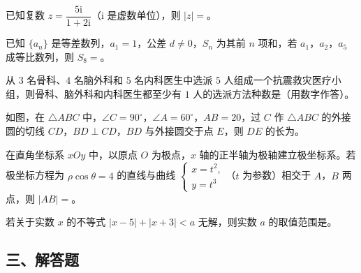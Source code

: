 \begin{question}
已知复数 $z=\dfrac{5\mathrm i}{1+2\mathrm i}$（$\mathrm i$ 是虚数单位），则 $|z|=$\gkblank{}。

\end{question}
\begin{question}
已知 $\{a_n\}$ 是等差数列，$a_1=1$，公差 $d\neq0$，$S_n$ 为其前 $n$ 项和，若 $a_1$，$a_2$，$a_5$ 成等比数列，则 $S_8=$\gkblank{}。

\end{question}
\begin{question}
从 $3$ 名骨科、$4$ 名脑外科和 $5$ 名内科医生中选派 $5$ 人组成一个抗震救灾医疗小组，则骨科、脑外科和内科医生都至少有 $1$ 人的选派方法种数是\gkblank{}（用数字作答）。

\Needspace{0.4\textheight}
\end{question}
\begin{question}
如图，在 $\triangle ABC$ 中，$\angle C=90^\circ$，$\angle A=60^\circ$，$AB=20$，过 $C$ 作 $\triangle ABC$ 的外接圆的切线 $CD$，$BD\perp CD$，$BD$ 与外接圆交于点 $E$，则 $DE$ 的长为\gkblank{}。
\nopagebreak[4]
\begin{center}\end{center}
\nopagebreak[4]
\end{question}
\begin{question}
在直角坐标系 $xOy$ 中，以原点 $O$ 为极点，$x$ 轴的正半轴为极轴建立极坐标系。若极坐标方程为 $\rho\cos\theta=4$ 的直线与曲线 $\begin{cases}x=t^2,\\y=t^3\end{cases}$（$t$ 为参数）相交于 $A$，$B$ 两点，则 $|AB|=$\gkblank{}。

\end{question}
\begin{question}
若关于实数 $x$ 的不等式 $|x-5|+|x+3|<a$ 无解，则实数 $a$ 的取值范围是\gkblank{}。

\end{question}
\begingroup
\renewcommand{\gkpart}[1]{\Needspace{0.2\textheight}\subsection*{#1}\nopagebreak}
\gkpart{三、解答题}
\endgroup

